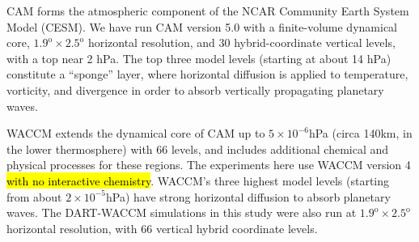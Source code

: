 CAM \citep{nealeetal2010} forms the atmospheric component of the NCAR Community Earth System Model (CESM). 
We have run CAM version 5.0 with a finite-volume dynamical core, $1.9^{\text{o}} \times 2.5^{\text{o}}$ horizontal resolution, and  30 hybrid-coordinate vertical levels, with a top near 2 hPa.
The top three model levels (starting at about 14 hPa) constitute a ``sponge'' layer, where horizontal diffusion is applied to temperature, vorticity, and divergence in order to absorb vertically propagating planetary waves.  

WACCM \citep{Marsh2013} extends the dynamical core of CAM up to $5 \times 10^{-6}$hPa (circa 140km, in the lower thermosphere) with 66 levels, and includes additional chemical and physical processes for these regions. 
The experiments here use WACCM version 4 \hl{with no interactive chemistry}.
WACCM's three highest model levels (starting from about $2 \times 10^{-5}$hPa) have strong horizontal diffusion to absorb planetary waves. 
The DART-WACCM simulations in this study were also run at $1.9^{\text{o}} \times 2.5^{\text{o}}$ horizontal resolution, with 66 vertical hybrid coordinate levels. 


